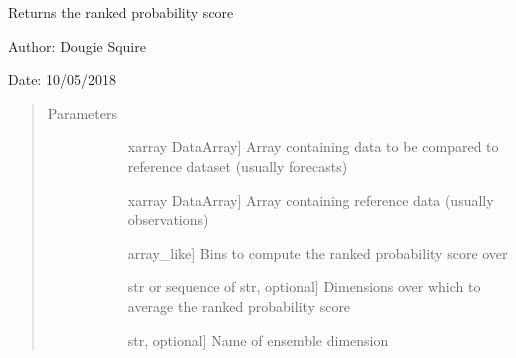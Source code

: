 \documentclass[letterpaper,10pt,english]{sphinxmanual}
\begin{document}
\begin{fulllineitems}
\begin{sphinxVerbatim}[commandchars=\\\{\}]
\PYG{g+go}{array([[1.      , 0.333333, 0.333333],}
\PYG{g+go}{       [0.      , 0.333333, 0.      ]])}
\end{sphinxVerbatim}

\end{fulllineitems}


\begin{fulllineitems}
\label{\detokenize{skill_doc:skill.rps}}
Returns the ranked probability score

\begin{DUlineblock}{0em}
\item[] Author: Dougie Squire
\item[] Date: 10/05/2018
\end{DUlineblock}
\begin{quote}\begin{description}
\item[{Parameters}] \leavevmode\begin{description}
\item[{}] \leavevmode{[}xarray DataArray{]}
Array containing data to be compared to reference dataset (usually forecasts)

\item[{}] \leavevmode{[}xarray DataArray{]}
Array containing reference data (usually observations)

\item[{}] \leavevmode{[}array\_like{]}
Bins to compute the ranked probability score over

\item[{}] \leavevmode{[}str or sequence of str, optional{]}
Dimensions over which to average the ranked probability score

\item[{}] \leavevmode{[}str, optional{]}
Name of ensemble dimension


\end{description}
\end{description}
\end{quote}
\end{fulllineitems}
\end{document}
